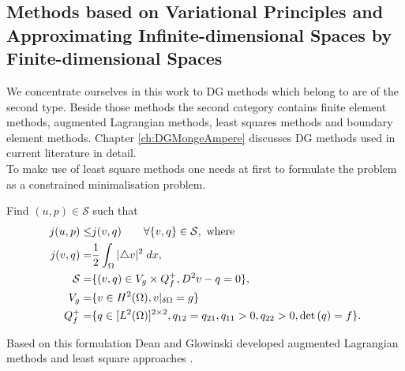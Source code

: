 \subsection{Methods based on Variational Principles and Approximating Infinite-dimensional Spaces by Finite-dimensional Spaces}
 We concentrate ourselves in this work to DG methods which belong to are of the second type. Beside those methods the second category contains finite element methods, augmented Lagrangian methods, least squares methods and boundary element methods. Chapter \ref{ch:DGMongeAmpere} discusses DG methods used in current literature in detail.\\
To make use of least square methods one needs at first to formulate the \MA problem as a constrained minimalisation problem.
\begin{definition}
Find $(u,p) \in \mathcal{S}$ such that
\begin{align}
	j(u,p) \leq& j(v,q) \qquad \forall \{v,q\} \in \mathcal{S}, \text{ where }\\
	j(v,q)  =& \frac 1 2 \int_{\Omega} {{|\triangle v |^2}\;dx}, \\
	\mathcal{S} =& \{(v,q)\in V_g \times Q^+_f, D^2v-q =0\},\\
	V_g =& \{v \in H^2(\Omega), v \arrowvert_{\delta \Omega}=g\} \\
	Q^+_f =& \{q \in [L^2(\Omega)]^{2\times2} , q_{12} =q_{21},  q_{11} > 0,q_{22} > 0, \det{\left(q\right)} = f\}.
\end{align}

\end{definition}
Based on this formulation Dean and Glowinski developed augmented Lagrangian methods and least square approaches \cite{DG2004,DG2006,DG2006a}.

